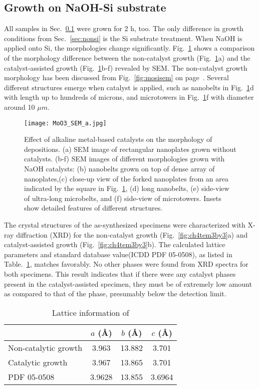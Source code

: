 \subsection{Growth on NaOH-Si substrate}\label{sec:naohsi}

All samples in Sec.~\ref{sec:naohsi} were grown for 2 h, too. The only difference in growth conditions from Sec.~\ref{sec:nonsi} is the Si substrate treatment. When NaOH is applied onto Si, the morphologies change significantly. Fig.~\ref{fig:ch4sem2by3} shows a comparison of the morphology difference between the non-catalyst growth (Fig.~\ref{fig:ch4sem2by3}a) and the catalyst-assisted growth (Fig.~\ref{fig:ch4sem2by3}b-f) revealed by SEM. The non-catalyst growth morphology has been discussed from Fig.~\ref{fig:mosisem} on page~\pageref{fig:mosisem}. Several different structures emerge when catalyst is applied, such as nanobelts in Fig.~\ref{fig:ch4sem2by3}d with length up to hundreds of microns, and microtowers in Fig.~\ref{fig:ch4sem2by3}f with diameter around 10 $\mu m$. 

\begin{figure}[htb]
\centering
\texttt{[image: MoO3\_SEM\_a.jpg]}
\caption[SEM imaging on  catalytic growth]{Effect of alkaline metal-based catalysts on the morphology of  depositions. (a) SEM image of rectangular nanoplates grown without catalysts. (b-f) SEM images of different morphologies grown with NaOH catalysts: (b) nanobelts grown on top of dense array of nanoplates,(c) close-up view of the forked nanoplates from an area indicated by the square in Fig.~\ref{fig:ch4sem2by3}, (d) long nanobelts, (e) side-view of ultra-long microbelts, and (f) side-view of microtowers. Insets show detailed features of different  structures.}
\label{fig:ch4sem2by3}
\end{figure}

The crystal structures of the as-synthesized specimens were characterized with X-ray diffraction (XRD) for the non-catalyst growth (Fig.~\ref{fig:ch4tem3by3}a) and catalyst-assisted growth (Fig.~\ref{fig:ch4tem3by3}b). The calculated lattice parameters and standard database value(ICDD PDF 05-0508), as listed in Table.~\ref{tab:ch4xrd}, matches favorably. No other phases were found from XRD spectra for both specimens. This result indicates that if there were any catalyst phases present in the catalyst-assisted specimen, they must be of extremely low amount as compared to that of the  phase, presumably below the detection limit. 
\begin{table}[htb]
\centering
\caption{Lattice information of }\label{tab:ch4xrd}
\begin{tabular}{lccc}
\toprule
           & $a$ (\AA) & $b$ (\AA) & $c$ (\AA)   \\
\midrule
Non-catalytic growth  & 3.963    & 13.882 & 3.701  \\
Catalytic growth  & 3.967    & 13.865 & 3.701  \\
PDF 05-0508       & 3.9628    & 13.855 & 3.6964  \\
\bottomrule
\end{tabular}
\end{table}

